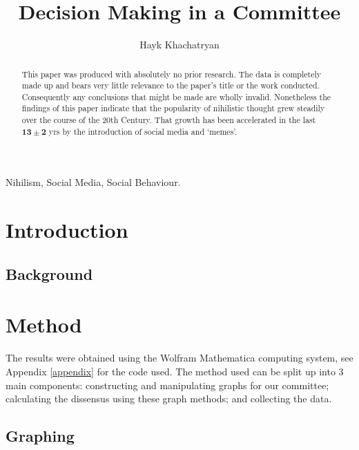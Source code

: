 \documentclass[a4paper, 10pt]{IEEEtran}
\begin{document}
\title{Decision Making in a Committee}
\author{Hayk Khachatryan}
\maketitle


\begin{abstract}
This paper was produced with absolutely no prior research. The data is completely made up and bears very little relevance to the paper's title or the work conducted. Consequently any conclusions that might be made are wholly invalid. Nonetheless the findings of this paper indicate that the popularity of nihilistic thought grew  steadily over the course of the 20th Century. That growth has been accelerated in the last $\bm{13 \pm 2}$ yrs by the introduction of social media and `memes'.
\end{abstract}

\begin{IEEEkeywords}
Nihilism, Social Media, Social Behaviour.
\end{IEEEkeywords}



\section{Introduction}
\label{sec:introduction} %

\subsection{Background}
\label{sec:background}



\section{Method}
\label{sec:method}

The results were obtained using the Wolfram Mathematica computing system, see Appendix \ref{appendix} for the code used. The method used can be split up into 3 main components: constructing and manipulating graphs for our committee; calculating the dissensus using these graph methods; and collecting the data.

\subsection{Graphing}
\label{sub:graphing}
\end{document}
